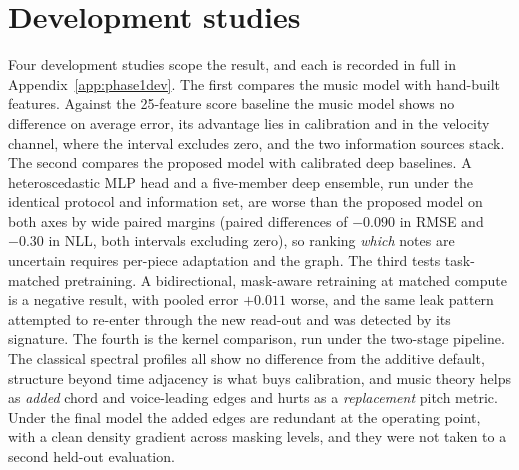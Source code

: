 \section{Development studies}\label{sec:devstudies}
Four development studies scope the result, and each is recorded in full in
Appendix~\ref{app:phase1dev}. The first compares the music model with
hand-built features. Against the 25-feature score baseline the music model
shows no difference on average error, its advantage lies in calibration and
in the velocity channel, where the interval excludes zero, and the two
information sources stack. The second compares the proposed model with
calibrated deep baselines. A heteroscedastic MLP head and a five-member deep
ensemble, run under the identical protocol and information set, are worse
than the proposed model on both axes by wide paired margins (paired
differences of $-0.090$ in RMSE and $-0.30$ in NLL, both intervals excluding
zero), so ranking \emph{which} notes are uncertain requires per-piece
adaptation and the graph. The third tests task-matched pretraining. A
bidirectional, mask-aware retraining at matched compute is a negative result,
with pooled error $+0.011$ worse, and the same leak pattern attempted to
re-enter through the new read-out and was detected by its signature. The
fourth is the kernel comparison, run under the two-stage pipeline. The
classical spectral profiles all show no difference from the additive default,
structure beyond time adjacency is what buys calibration, and music theory
helps as \emph{added} chord and voice-leading edges and hurts as a
\emph{replacement} pitch metric. Under the final model the added edges are
redundant at the operating point, with a clean density gradient across
masking levels, and they were not taken to a second held-out evaluation.

